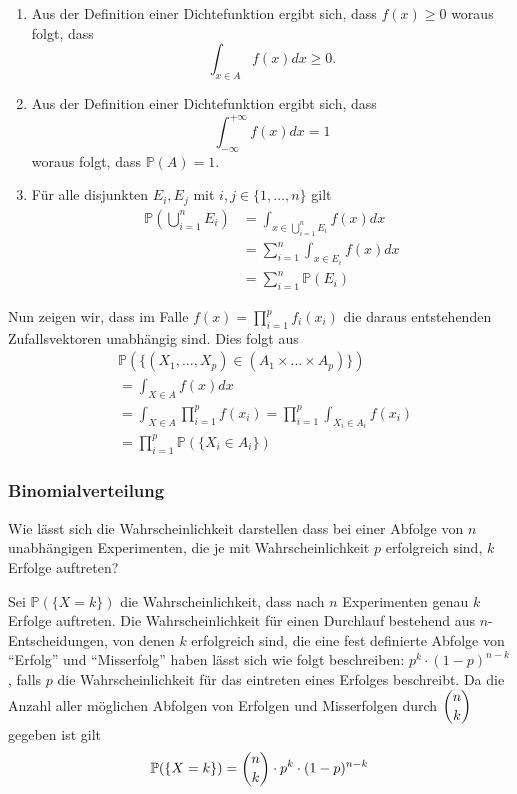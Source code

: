 \begin{enumerate}
\item Aus der Definition einer Dichtefunktion ergibt sich, dass $f(x)\geq 0$ woraus folgt, dass \begin{equation*}\int_{x\in A}f(x)dx\geq 0. \end{equation*}
\item Aus der Definition einer Dichtefunktion ergibt sich, dass \begin{equation*}\int_{-\infty}^{+\infty}f(x)dx= 1 \end{equation*} woraus folgt, dass $\mathbb{P}(A)=1$.
\item Für alle disjunkten $E_i,E_j$ mit $i,j\in \{1,\dots ,n\}$ gilt
\begin{align*}
\mathbb{P}\left(\bigcup_{i=1}^{n} E_i\right)&=\int_{x\in \bigcup_{i=1}^{n}E_i}{f(x)dx}\\
&=\sum_{i=1}^{n}{\int_{x\in E_i}{f(x)dx}}\\
&=\sum_{i=1}^{n}{\mathbb{P}(E_i)}
\end{align*}
\end{enumerate}
Nun zeigen wir, dass im Falle $f(x) = \prod_{i=1}^p f_i(x_i)$ die daraus entstehenden Zufallsvektoren unabhängig sind. Dies folgt aus
\begin{align*}
&\mathbb{P}(\{(X_{1}, ... , X_{p}) \in (A_{1} \times ... \times A_{p})\} )\\ &= \int_{X \in A}{f(x)dx}\\
&= \int_{X \in A}{\prod_{i=1}^{p}{f(x_{i})}} = \prod_{i=1}^{p}{\int_{X_{i} \in A_{i}}{f(x_{i})}}\\
&= \prod_{i=1}^{p}{\mathbb{P} (\{X_{i} \in A_{i}\})}
\end{align*}

\subsubsection{Binomialverteilung}
Wie lässt sich die Wahrscheinlichkeit darstellen dass bei einer Abfolge von $n$ unabhängigen Experimenten, die je mit Wahrscheinlichkeit $p$ erfolgreich sind, $k$ Erfolge auftreten?

Sei $\mathbb{P}(\{X=k\})$ die Wahrscheinlichkeit, dass nach $n$ Experimenten genau $k$ Erfolge auftreten.
Die Wahrscheinlichkeit für einen Durchlauf bestehend aus $n$-Entscheidungen, von denen $k$ erfolgreich sind, die eine fest definierte Abfolge von \enquote{Erfolg} und \enquote{Misserfolg} haben lässt sich wie folgt beschreiben:
$p^k\cdot (1-p)^{n-k}$, falls $p$ die Wahrscheinlichkeit für das eintreten eines Erfolges beschreibt. Da die Anzahl aller möglichen Abfolgen von Erfolgen und Misserfolgen durch $\dbinom{n}{k}$ gegeben ist gilt
\begin{equation*}
\mathbb{P}(\{X=k\})=\dbinom{n}{k}\cdot p^k\cdot (1-p)^{n-k}
\end{equation*}
